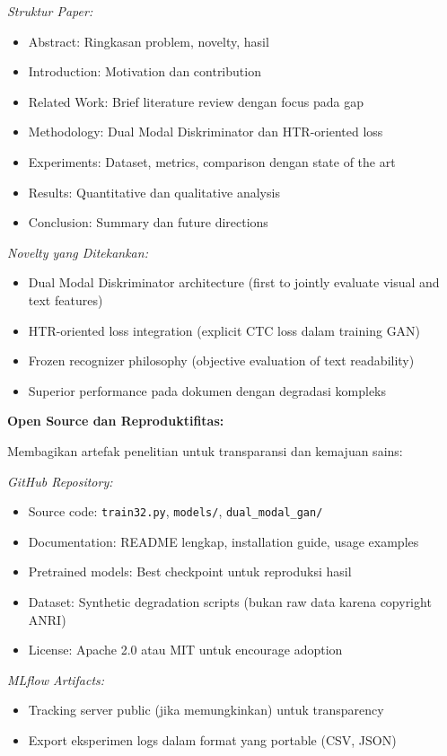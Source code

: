 \documentclass[12pt,a4paper]{article}
\begin{document}
\textit{Struktur Paper:}
\begin{itemize}[leftmargin=*, nosep]
\item Abstract: Ringkasan problem, novelty, hasil
\item Introduction: Motivation dan contribution
\item Related Work: Brief literature review dengan focus pada gap
\item Methodology: Dual Modal Diskriminator dan HTR-oriented loss
\item Experiments: Dataset, metrics, comparison dengan state of the art
\item Results: Quantitative dan qualitative analysis
\item Conclusion: Summary dan future directions
\end{itemize}

\textit{Novelty yang Ditekankan:}
\begin{itemize}[leftmargin=*, nosep]
\item Dual Modal Diskriminator architecture (first to jointly evaluate visual and text features)
\item HTR-oriented loss integration (explicit CTC loss dalam training GAN)
\item Frozen recognizer philosophy (objective evaluation of text readability)
\item Superior performance pada dokumen dengan degradasi kompleks
\end{itemize}

\textbf{Open Source dan Reproduktifitas:}

Membagikan artefak penelitian untuk transparansi dan kemajuan sains:

\textit{GitHub Repository:}
\begin{itemize}[leftmargin=*, nosep]
\item Source code: \texttt{train32.py}, \texttt{models/}, \texttt{dual\_modal\_gan/}
\item Documentation: README lengkap, installation guide, usage examples
\item Pretrained models: Best checkpoint untuk reproduksi hasil
\item Dataset: Synthetic degradation scripts (bukan raw data karena copyright ANRI)
\item License: Apache 2.0 atau MIT untuk encourage adoption
\end{itemize}

\textit{MLflow Artifacts:}
\begin{itemize}[leftmargin=*, nosep]
\item Tracking server public (jika memungkinkan) untuk transparency
\item Export eksperimen logs dalam format yang portable (CSV, JSON)
\end{itemize}
\end{document}
